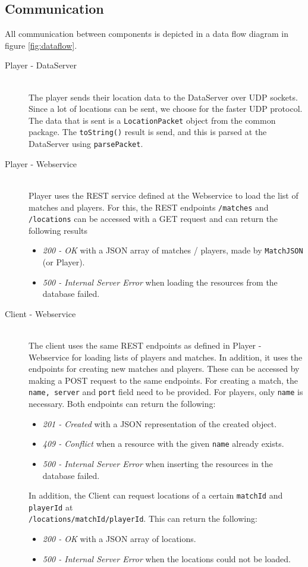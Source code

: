 \subsection{Communication}
All communication between components is depicted in a data flow diagram in figure \ref{fig:dataflow}.
\begin{description}
\item[Player - DataServer] \hfill \\
The player sends their location data to the DataServer over UDP sockets. Since a lot of locations can be sent, we choose for the faster UDP protocol. The data that is sent is a \texttt{LocationPacket} object from the common package. The \texttt{toString()} result is send, and this is parsed at the DataServer using \texttt{parsePacket}.

\item[Player - Webservice] \hfill \\
Player uses the REST service defined at the Webservice to load the list of matches and players. For this, the REST endpoints \texttt{/matches} and \texttt{/locations} can be accessed with a GET request and can return the following results
\begin{itemize}
    \item \emph{200 - OK} with a JSON array of matches / players, made by \texttt{MatchJSON} (or Player).
    \item \emph{500 - Internal Server Error} when loading the resources from the database failed.
\end{itemize}

\item[Client - Webservice] \hfill \\ 
The client uses the same REST endpoints as defined in Player - Webservice for loading lists of players and matches. In addition, it uses the endpoints for creating new matches and players. These can be accessed by making a POST request to the same endpoints. For creating a match, the \texttt{name, server} and \texttt{port} field need to be provided. For players, only \texttt{name} is necessary. Both endpoints can return the following:
\begin{itemize}
    \item \emph{201 - Created} with a JSON representation of the created object.
    \item \emph{409 - Conflict} when a resource with the given \texttt{name} already exists.
    \item \emph{500 - Internal Server Error} when inserting the resources in the database failed.
\end{itemize}
In addition, the Client can request locations of a certain \texttt{matchId} and \texttt{playerId} at \\ \texttt{/locations/{matchId}/{playerId}}. This can return the following:
\begin{itemize}
    \item \emph{200 - OK} with a JSON array of locations.
    \item \emph{500 - Internal Server Error} when the locations could not be loaded.
\end{itemize}



\end{description}
